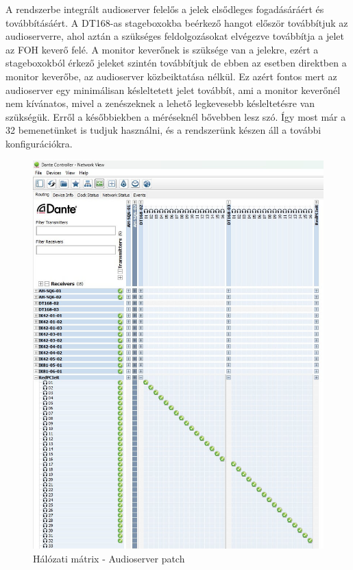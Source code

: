 A rendszerbe integrált audioserver felelős a jelek elsődleges fogadásáráért és továbbításáért.
A DT168-as stageboxokba beérkező hangot először továbbítjuk az audioserverre, ahol aztán a
szükséges feldolgozásokat elvégezve továbbítja a jelet az FOH keverő felé.
A monitor keverőnek is szüksége van a jelekre, ezért a stageboxokból érkező jeleket szintén továbbítjuk
de ebben az esetben direktben a monitor keverőbe, az audioserver közbeiktatása nélkül.
Ez azért fontos mert az audioserver egy minimálisan késleltetett jelet továbbít, ami a monitor keverőnél
nem kívánatos, mivel a zenészeknek a lehető legkevesebb késleltetésre van szükségük. Erről a későbbiekben a méréseknél
bővebben lesz szó. 
Így most már a 32 bemenetünket is tudjuk használni, és a rendszerünk készen áll a további konfigurációkra.
\begin{figure}[H]
	\centering
	\includegraphics[width=\textwidth, keepaspectratio]{figures/dante_audioserver_patch.jpg}
	\caption{Hálózati mátrix - Audioserver patch}\label{fig:dante_audioserver_patch}
\end{figure}

